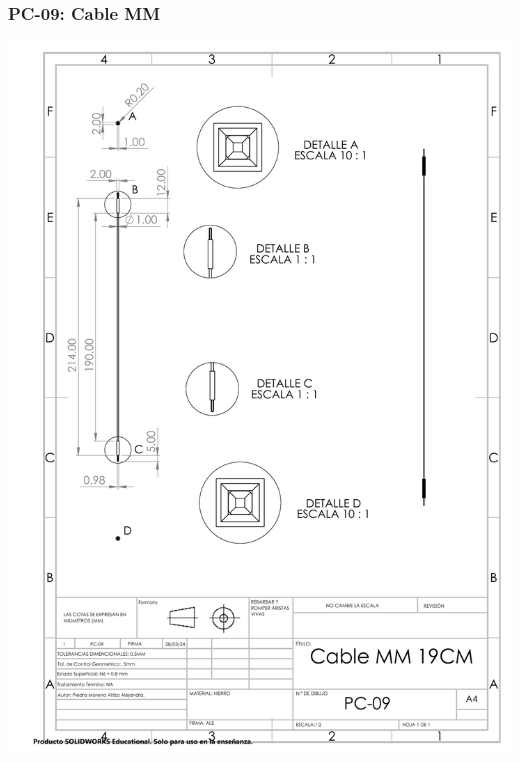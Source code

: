 \subsubsection{PC-09: Cable MM }
\begin{center}
\includegraphics[width=.85\textwidth]{22/img/cableMMDibujo.PDF}~\\[15cm]
\end{center}






